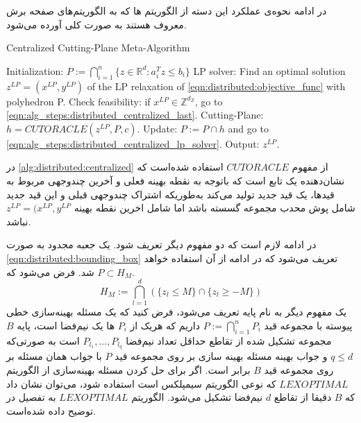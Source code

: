 	در ادامه نحوه‌ی عملکرد این دسته از الگوریتم ها که به الگوریتم‌های صفحه برش معروف هستند به صورت کلی آورده می‌شود. 
\begin{latin}
	\begin{algorithm}
		\caption{Centralized Cutting-Plane Meta-Algorithm}
		\label{alg:distributed:centralized}
		\begin{algorithmic}[1]
			\State Initialization: $ P := \bigcap_{i=1}^n \{ z \in \mathbb{R}^d : a_i^Tz \le b_i\}$
			\State LP solver: Find an optimal solution $z^{LP} = (x^{LP},y^{LP})$ of the LP relaxation of \cref{eqn:distributed:objective_func} with polyhedron P. \label{eqn:alg_steps:distributed_centralized_lp_solver}
			\State Check feasibility: if $x^{LP} \in \mathbb{Z}^{d_Z}$, go to \cref{eqn:alg_steps:distributed_centralized_last}.
			\State Cutting-Plane: $h = CUTORACLE(z^{LP},P,c)$.
			\State Update: $P := P \cap h$ and go to \cref{eqn:alg_steps:distributed_centralized_lp_solver}.
			\State Output: $z^{LP}$\label{eqn:alg_steps:distributed_centralized_last}.
		\end{algorithmic}
	\end{algorithm}
\end{latin}
	در \cref{alg:distributed:centralized} از مفهوم $CUTORACLE$ استفاده شده‌است که نشان‌دهنده یک تابع است که باتوجه به نقطه بهینه فعلی و آخرین چندوجهی مربوط به قیدها، یک قید جدید تولید می‌کند به‌طوریکه اشتراک چندوجهی قبلی و این قید جدید شامل پوش محدب مجموعه گسسته  باشد اما شامل اخرین نقطه بهینه $z^{LP} = (x^{LP},y^{LP}$ نباشد.
	
	در ادامه لازم است که دو مفهوم دیگر تعریف شود. یک جعبه مجدود به صورت \cref{eqn:distributed:bounding_box} تعریف می‌شود که در ادامه از آن استفاده خواهد شد. فرض می‌شود که $P \subset H_M$.
\begin{equation}\label{eqn:distributed:bounding_box}
H_M := \bigcap_{l=1}^d (\{ z_l \le M \} \cap \{ z_l \ge -M \})
\end{equation}
	یک مفهوم دیگر به نام پایه تعریف می‌شود، فرض کنید که یک مسئله بهینه‌سازی خطی پیوسته با مجموعه قید $P := \bigcap_{i=1}^n P_i$ داریم که هریک از $P_i$ ها یک نیم‌فضا است، پایه $B$ مجموعه‌ تشکیل شده از تقاطع حداقل تعداد نیم‌فضا $P_{l_1}, \dots, P_{l_q}$ است به صورتی‌که $q \le d$ و جواب بهینه مسئله بهینه سازی بر روی مجموعه قید $P$ با جواب همان مسئله بر روی مجموعه قید $B$ برابر است. اگر برای حل کردن مسئله بهینه‌سازی از الگوریتم $LEXOPTIMAL$ که نوعی الگوریتم سیمپلکس است استفاده شود، می‌توان نشان داد که $B$ دقیقا از تقاطع $d$ نیم‌فضا تشکیل می‌شود.  الگوریتم $LEXOPTIMAL$ به تفصیل در \cite{lexoptimal} توضیح داده شده‌است.
	
